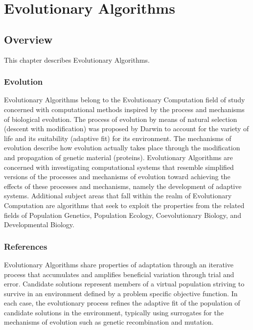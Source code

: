 

\chapter{Evolutionary Algorithms}
\label{ch:evolutionary}
\renewcommand{\bibsection}{\subsection{\bibname}}
\begin{bibunit}

\section{Overview}
This chapter describes Evolutionary Algorithms.

\subsection{Evolution}
Evolutionary Algorithms belong to the Evolutionary Computation field of study concerned with computational methods inspired by the process and mechanisms of biological evolution.
The process of evolution by means of natural selection (descent with modification) was proposed by Darwin to account for the variety of life and its suitability (adaptive fit) for its environment. The mechanisms of evolution describe how evolution actually takes place through the modification and propagation of genetic material (proteins).
Evolutionary Algorithms are concerned with investigating computational systems that resemble simplified versions of the processes and mechanisms of evolution toward achieving the effects of these processes and mechanisms, namely the development of adaptive systems.
Additional subject areas that fall within the realm of Evolutionary Computation are algorithms that seek to exploit the properties from the related fields of Population Genetics, Population Ecology, Coevolutionary Biology, and Developmental Biology.

\subsection{References}
Evolutionary Algorithms share properties of adaptation through an iterative process that accumulates and amplifies beneficial variation through trial and error. Candidate solutions represent members of a virtual population striving to survive in an environment defined by a problem specific objective function. In each case, the evolutionary process refines the adaptive fit of the population of candidate solutions in the environment, typically using surrogates for the mechanisms of evolution such as genetic recombination and mutation.


\end{bibunit}
